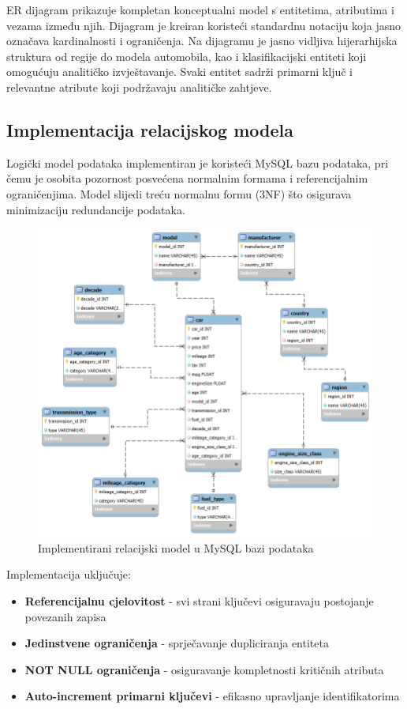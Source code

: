 ER dijagram prikazuje kompletan konceptualni model s entitetima, atributima i vezama između njih. Dijagram je kreiran koristeći standardnu notaciju koja jasno označava kardinalnosti i ograničenja. Na dijagramu je jasno vidljiva hijerarhijska struktura od regije do modela automobila, kao i klasifikacijski entiteti koji omogućuju analitičko izvještavanje. Svaki entitet sadrži primarni ključ i relevantne atribute koji podržavaju analitičke zahtjeve.

\subsection{Implementacija relacijskog modela}

Logički model podataka implementiran je koristeći MySQL bazu podataka, pri čemu je osobita pozornost posvećena normalnim formama i referencijalnim ograničenjima. Model slijedi treću normalnu formu (3NF) što osigurava minimizaciju redundancije podataka.

\begin{figure}[H]
    \centering
    \includegraphics[width=1.0\textwidth]{slike/relational_model/relacijski-model.png}
    \caption{Implementirani relacijski model u MySQL bazi podataka}
    \label{fig:relacijski-model}
\end{figure}

Implementacija uključuje:
\begin{itemize}
    \item \textbf{Referencijalnu cjelovitost} - svi strani ključevi osiguravaju postojanje povezanih zapisa
    \item \textbf{Jedinstvene ograničenja} - sprječavanje dupliciranja entiteta
    \item \textbf{NOT NULL ograničenja} - osiguravanje kompletnosti kritičnih atributa
    \item \textbf{Auto-increment primarni ključevi} - efikasno upravljanje identifikatorima
\end{itemize}

